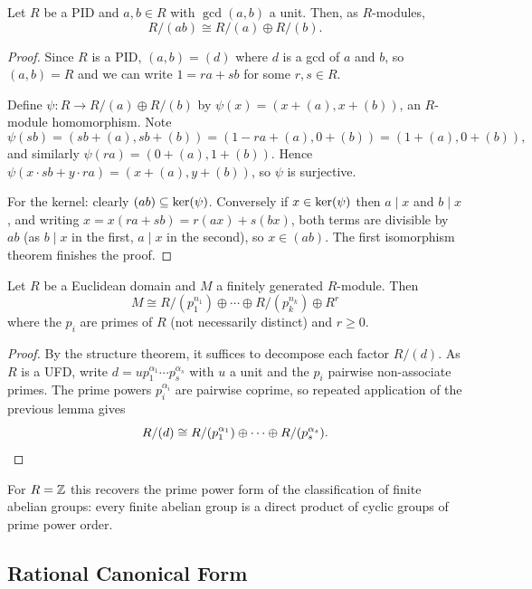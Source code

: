 \documentclass[a4paper]{scrartcl}
\begin{document}
\begin{lemma}
	Let $R$ be a PID and $a, b \in R$ with $\gcd(a, b)$ a unit. Then, as $R$-modules,
	$$
	R/(ab) \cong R/(a) \oplus R/(b).
	$$
\end{lemma}
\begin{proof}
	Since $R$ is a PID, $(a, b) = (d)$ where $d$ is a gcd of $a$ and $b$, so $(a,b) = R$ and we can write $1 = ra + sb$ for some $r, s \in R$.

	Define $\psi: R \rightarrow R/(a) \oplus R/(b)$ by $\psi(x) = (x + (a), x + (b))$, an $R$-module homomorphism. Note
	$$
	\psi(sb) = (sb + (a), sb + (b)) = (1 - ra + (a), 0 + (b)) = (1 + (a), 0 + (b)),
	$$
	and similarly $\psi(ra) = (0 + (a), 1 + (b))$. Hence $\psi(x \cdot sb + y \cdot ra) = (x + (a), y + (b))$, so $\psi$ is surjective.

	For the kernel: clearly $(ab) \subseteq \operatorname{ker}(\psi)$. Conversely if $x \in \operatorname{ker}(\psi)$ then $a \mid x$ and $b \mid x$, and writing $x = x(ra + sb) = r(ax) + s(bx)$, both terms are divisible by $ab$ (as $b \mid x$ in the first, $a \mid x$ in the second), so $x \in (ab)$. The first isomorphism theorem finishes the proof.
\end{proof}

\begin{theorem}
	Let $R$ be a Euclidean domain and $M$ a finitely generated $R$-module. Then
	$$
	M \cong R/(p_1^{n_1}) \oplus \cdots \oplus R/(p_k^{n_k}) \oplus R^r
	$$
	where the $p_i$ are primes of $R$ (not necessarily distinct) and $r \geq 0$.
\end{theorem}
\begin{proof}
	By the structure theorem, it suffices to decompose each factor $R/(d)$. As $R$ is a UFD, write $d = u p_1^{\alpha_1}\cdots p_s^{\alpha_s}$ with $u$ a unit and the $p_i$ pairwise non-associate primes. The prime powers $p_i^{\alpha_i}$ are pairwise coprime, so repeated application of the previous lemma gives
	$$
	R/(d) \cong R/(p_1^{\alpha_1}) \oplus \cdots \oplus R/(p_s^{\alpha_s}). \qedhere
	$$
\end{proof}

For $R = \mathbb{Z}$ this recovers the prime power form of the classification of finite abelian groups: every finite abelian group is a direct product of cyclic groups of prime power order.

\subsection{Rational Canonical Form}
\end{document}
